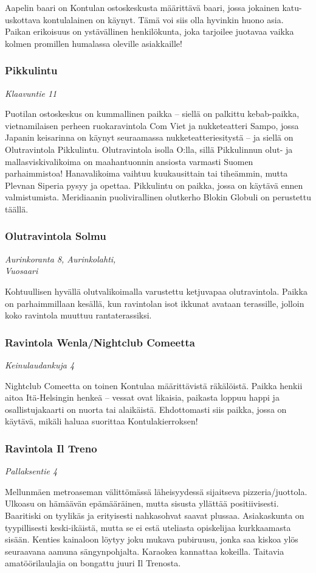 \documentclass[../ala_hataile.tex]{subfiles}
\begin{document}
Aapelin baari on Kontulan ostoskeskusta
määrittävä baari, jossa jokainen katu-uskottava
kontulalainen on käynyt. Tämä voi
siis olla hyvinkin huono asia. Paikan erikoisuus
on ystävällinen henkilökunta, joka
tarjoilee juotavaa vaikka kolmen promillen
humalassa oleville asiakkaille!
\subsubsection*{Pikkulintu}
\textit{Klaavuntie 11}

Puotilan ostoskeskus on kummallinen
paikka -- siellä on palkittu kebab-paikka,
vietnamilaisen perheen ruokaravintola
Com Viet ja nukketeatteri Sampo, jossa
Japanin keisarinna on käynyt seuraamassa
nukketeatteriesitystä -- ja siellä on Olutravintola
Pikkulintu. Olutravintola isolla
O:lla, sillä Pikkulinnun olut- ja mallasviskivalikoima
on maahantuonnin ansiosta
varmasti Suomen parhaimmistoa! Hanavalikoima
vaihtuu kuukausittain tai tiheämmin,
mutta Plevnan Siperia pysyy ja opettaa.
Pikkulintu on paikka, jossa on käytävä
ennen valmistumista. Meridiaanin puolivirallinen olutkerho Blokin Globuli on perustettu täällä.
\subsubsection*{Olutravintola Solmu}
\textit{Aurinkoranta 8, Aurinkolahti, \\Vuosaari}

Kohtuullisen hyvällä olutvalikoimalla
varustettu ketjuvapaa olutravintola. Paikka
on parhaimmillaan kesällä, kun ravintolan
isot ikkunat avataan terassille, jolloin koko
ravintola muuttuu rantaterassiksi.
\subsubsection*{Ravintola Wenla/Nightclub Comeetta}
\textit{Keinulaudankuja 4 }

Nightclub Comeetta
on toinen Kontulaa määrittävistä räkälöistä.
Paikka henkii aitoa Itä-Helsingin henkeä
-- vessat ovat likaisia, paikasta loppuu
happi ja osallistujakaarti on nuorta tai alaikäistä.
Ehdottomasti siis paikka, jossa on
käytävä, mikäli haluaa suorittaa Kontulakierroksen!
\subsubsection*{Ravintola Il Treno}
\textit{Pallaksentie 4}

Mellunmäen metroaseman välittömässä
läheisyydessä sijaitseva pizzeria/juottola.
Ulkoasu on hämäävän epämääräinen, mutta
sisusta yllättää positiivisesti. Baaritiski
on tyylikäs ja erityisesti nahkasohvat saavat
plussaa. Asiakaskunta on tyypillisesti
keski-ikäistä, mutta se ei estä uteliasta
opiskelijaa kurkkaamasta sisään. Kenties
kainaloon löytyy joku mukava pubiruusu,
jonka saa kiskoa ylös seuraavana aamuna
sängynpohjalta. Karaokea kannattaa kokeilla.
Taitavia amatöörilaulajia on bongattu
juuri Il Trenosta.
\end{document}
